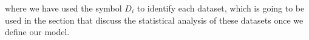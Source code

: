 \documentclass[a4paper,11pt]{article}
\newcommand*{\blue}{\textcolor{blue}}
\begin{document}
\noindent where we have used the symbol $D_i$ to identify each dataset, which is going to be used in the section that discuss the statistical analysis of these datasets once we define our model. 




\end{document}
